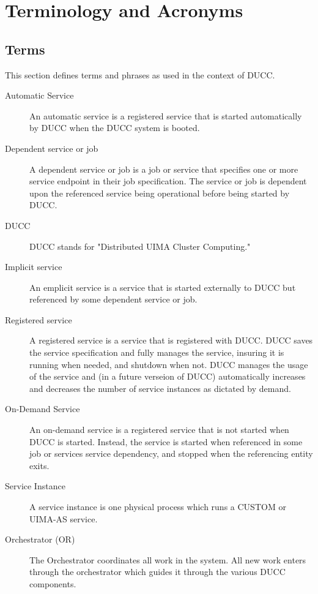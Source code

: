 \chapter{Terminology and Acronyms}

\section{Terms }
    This section defines terms and phrases as used in the context of DUCC. 

\begin{description}
\item[Automatic Service ] An automatic service is a registered service that is started automatically
  by DUCC when the DUCC system is booted.

\item[Dependent service or job ] A dependent service or job is a job or service that specifies one
  or more service endpoint in their job specification. The service or job is dependent upon the
  referenced service being operational before being started by DUCC.

\item[DUCC ] DUCC stands for "Distributed UIMA Cluster Computing."

\item[Implicit service ] An emplicit service is a service that is started externally to DUCC but
  referenced by some dependent service or job. 

\item[Registered service ] A registered service is a service that is registered with DUCC. DUCC
  saves the service specification and fully manages the service, insuring it is running when needed,
  and shutdown when not. DUCC manages the usage of the service and (in a future verseion of DUCC)
  automatically increases and decreases the number of service instances as dictated by demand.

\item[On-Demand Service] An on-demand service is a registered service that is not started when DUCC
  is started. Instead, the service is started when referenced in some job or services service
  dependency, and stopped when the referencing entity exits.

\item[Service Instance ] A service instance is one physical process which runs a CUSTOM or UIMA-AS
  service.

\item[Orchestrator (OR) ] The Orchestrator coordinates all work in the system. All new work enters
  through the orchestrator which guides it through the various DUCC components.


\end{description}
